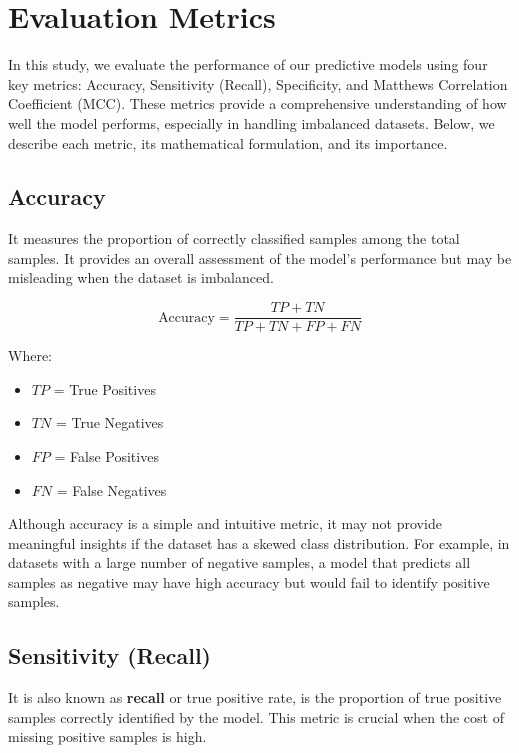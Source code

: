 \section{Evaluation Metrics}\label{sec:evaluation-metrics}

  In this study, we evaluate the performance of our predictive models using four key metrics: Accuracy, Sensitivity (Recall), Specificity, and Matthews Correlation Coefficient (MCC). These metrics provide a comprehensive understanding of how well the model performs, especially in handling imbalanced datasets.
  Below, we describe each metric, its mathematical formulation, and its importance.

  \subsection{Accuracy}\label{subsec:accuracy}
    It measures the proportion of correctly classified samples among the total samples.
    It provides an overall assessment of the model's performance but may be misleading when the dataset is imbalanced.

    \begin{equation}
      \text{Accuracy} = \frac{TP + TN}{TP + TN + FP + FN}\label{eq:accuracy}
    \end{equation}

    Where:
    \begin{itemize}
      \item $TP$ = True Positives
      \item $TN$ = True Negatives
      \item $FP$ = False Positives
      \item $FN$ = False Negatives
    \end{itemize}

    Although accuracy is a simple and intuitive metric, it may not provide meaningful insights if the dataset has a skewed class distribution.
    For example, in datasets with a large number of negative samples, a model that predicts all samples as negative may have high accuracy but would fail to identify positive samples.

  \subsection{Sensitivity (Recall)}\label{subsec:sensitivity-(recall)}
    It is also known as \textbf{recall} or true positive rate, is the proportion of true positive samples correctly identified by the model.
    This metric is crucial when the cost of missing positive samples is high.

